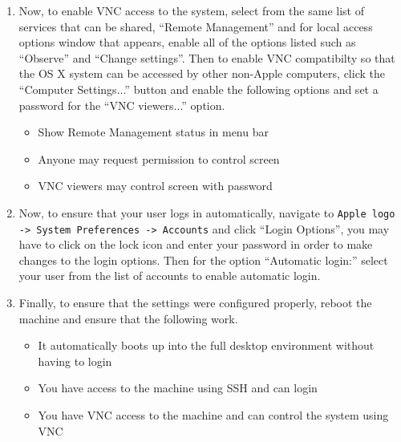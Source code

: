 \begin{enumerate}
\item	Now, to enable VNC access to the system, select from the same list of services that can be shared, ``Remote Management'' and
		for local access options window that appears, enable all of the options listed such as ``Observe'' and ``Change settings''.
		Then to enable VNC compatibilty so that the OS X system can be accessed by other non-Apple computers, click the ``Computer
		Settings...'' button and enable the following options and set a password for the ``VNC viewers...'' option.
\begin{itemize}
\item	Show Remote Management status in menu bar
\item	Anyone may request permission to control screen
\item	VNC viewers may control screen with password
\end{itemize}

\item	Now, to ensure that your user logs in automatically, navigate to \verb|Apple logo -> System Preferences -> Accounts| and click
		``Login Options'', you may have to click on the lock icon and enter your password in order to make changes to the login options. 
		Then for the option ``Automatic login:'' select your user from the list of accounts to enable automatic login.
		
\item 	Finally, to ensure that the settings were configured properly, reboot the machine and ensure that the following work.
\begin{itemize}
\item	It automatically boots up into the full desktop environment without having to login
\item	You have access to the machine using SSH and can login
\item	You have VNC access to the machine and can control the system using VNC	
\end{itemize}
\end{enumerate}




\newpage
